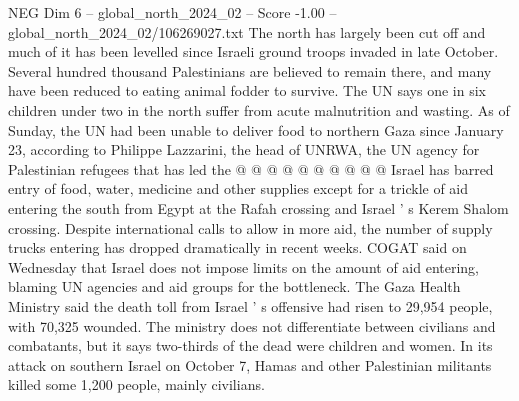 \begin{textsample}{NEG Dim 6 – global\_north\_2024\_02 – Score -1.00 – global\_north\_2024\_02/106269027.txt}
The north has largely been cut off and much of it has been levelled since Israeli ground troops invaded in late October.
Several hundred thousand Palestinians are believed to remain there, and many have been reduced to eating animal fodder to survive.
The UN says one in six children under two in the north suffer from acute malnutrition and wasting.
As of Sunday, the UN had been unable to deliver food to northern Gaza since January 23, according to Philippe Lazzarini, the head of UNRWA, the UN agency for Palestinian refugees that has led the @ @ @ @ @ @ @ @ @ @ Israel has barred entry of food, water, medicine and other supplies except for a trickle of aid entering the south from Egypt at the Rafah crossing and Israel ' s Kerem Shalom crossing.
Despite international calls to allow in more aid, the number of supply trucks entering has dropped dramatically in recent weeks.
COGAT said on Wednesday that Israel does not impose limits on the amount of aid entering, blaming UN agencies and aid groups for the bottleneck.
The Gaza Health Ministry said the death toll from Israel ' s offensive had risen to 29,954 people, with 70,325 wounded.
The ministry does not differentiate between civilians and combatants, but it says two-thirds of the dead were children and women.
In its attack on southern Israel on October 7, Hamas and other Palestinian militants killed some 1,200 people, mainly civilians.

\end{textsample}
